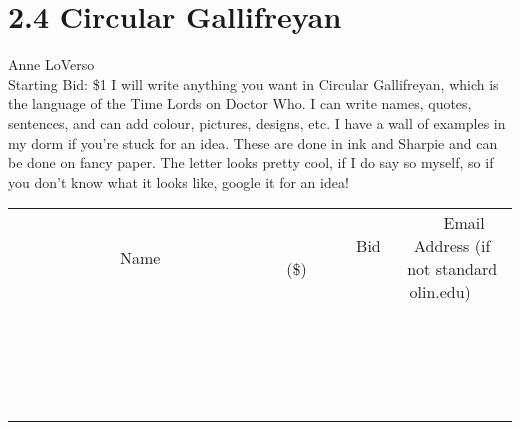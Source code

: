 \documentclass[11pt]{article}
\begin{document}
\section*{2.4 Circular Gallifreyan}
Anne LoVerso
\\
Starting Bid: \$1
\newline
I will write anything you want in Circular Gallifreyan, which is the language of the Time Lords on Doctor Who.  I can write names, quotes, sentences, and can add colour, pictures, designs, etc.  I have a wall of examples in my dorm if you're stuck for an idea.
These are done in ink and Sharpie and can be done on fancy paper.
The letter looks pretty cool, if I do say so myself, so if you don't know what it looks like, google it for an idea!
\\[3ex]
\begin{tabular}{c c c}
~~~~~~~~~~~~~Name~~~~~~~~~~~~~ & ~~~~~~~~~Bid (\$)~~~~~~~~~  & ~~~Email Address (if not standard olin.edu)~~~\\
 & & \\
\hline
 & & \\
\hline
 & & \\
\hline
 & & \\
\hline
 & & \\
\hline
 & & \\
\hline
 & & \\
\hline
 & & \\
\hline
 & & \\
\hline
 & & \\
\hline
 & & \\
\hline
 & & \\
\hline
 & & \\
\hline
 & & \\
\hline
 & & \\
\hline
 & & \\
\hline
 & & \\
\hline
 & & \\
\hline
 & & \\
\hline
\end{tabular}
\newpage
\end{document}
